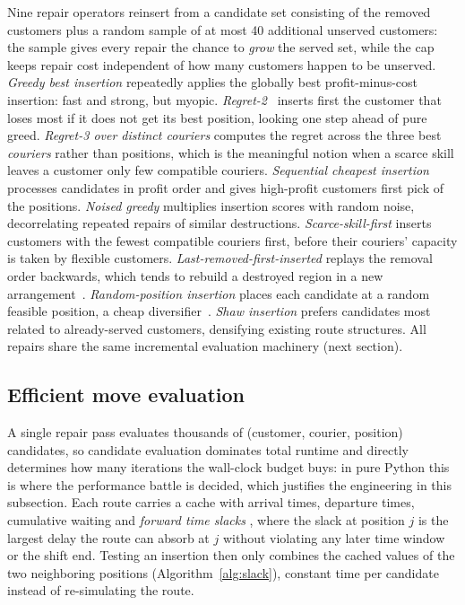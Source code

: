 \documentclass[10pt, a4paper]{article}
\begin{document}
Nine repair operators reinsert from a candidate set consisting of the
removed customers plus a random sample of at most 40 additional unserved
customers: the sample gives every repair the chance to \emph{grow} the
served set, while the cap keeps repair cost independent of how many
customers happen to be unserved.
\emph{Greedy best insertion} repeatedly applies the globally best
profit-minus-cost insertion: fast and strong, but myopic.
\emph{Regret-2}~\cite{ropke2006} inserts first the customer that loses most
if it does not get its best position, looking one step ahead of pure greed.
\emph{Regret-3 over distinct couriers} computes the regret across the three
best \emph{couriers} rather than positions, which is the meaningful notion
when a scarce skill leaves a customer only few compatible couriers.
\emph{Sequential cheapest insertion} processes candidates in profit order
and gives high-profit customers first pick of the positions.
\emph{Noised greedy} multiplies insertion scores with random noise,
decorrelating repeated repairs of similar destructions.
\emph{Scarce-skill-first} inserts customers with the fewest compatible
couriers first, before their couriers' capacity is taken by flexible
customers.
\emph{Last-removed-first-inserted} replays the removal order backwards,
which tends to rebuild a destroyed region in a new
arrangement~\cite{hammami2020}.
\emph{Random-position insertion} places each candidate at a random feasible
position, a cheap diversifier~\cite{hammami2020}.
\emph{Shaw insertion} prefers candidates most related to already-served
customers, densifying existing route structures. All repairs share the same
incremental evaluation machinery (next section).

\subsection{Efficient move evaluation}

A single repair pass evaluates thousands of (customer, courier, position)
candidates, so candidate evaluation dominates total runtime and directly
determines how many iterations the wall-clock budget buys: in pure Python
this is where the performance battle is decided, which justifies the
engineering in this subsection. Each route carries a cache with arrival
times, departure times, cumulative waiting and \emph{forward time slacks}
\cite{savelsbergh1992}, where the slack at position $j$ is the largest
delay the route can absorb at $j$ without violating any later time window
or the shift end. Testing an insertion then only combines the cached values
of the two neighboring positions (Algorithm~\ref{alg:slack}), constant time
per candidate instead of re-simulating the route.
\end{document}
